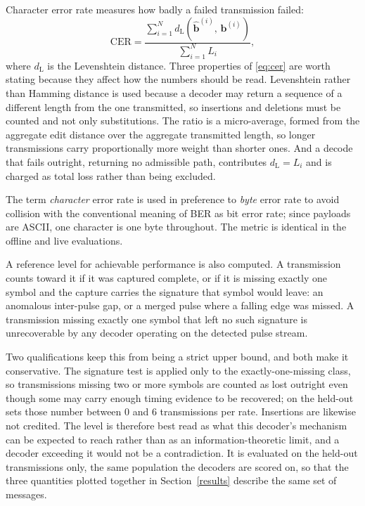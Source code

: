 Character error rate measures how badly a failed transmission failed:
\begin{equation}
\mathrm{CER} = \frac{\sum_{i=1}^{N}
  d_{\mathrm{L}}\!\left(\hat{\mathbf{b}}^{(i)},\,\mathbf{b}^{(i)}\right)}
  {\sum_{i=1}^{N} L_i},
\label{eq:cer}
\end{equation}
where $d_{\mathrm{L}}$ is the Levenshtein distance. Three properties of
\eqref{eq:cer} are worth stating because they affect how the numbers should be
read. Levenshtein rather than Hamming distance is used because a decoder may
return a sequence of a different length from the one transmitted, so insertions
and deletions must be counted and not only substitutions. The ratio is a
micro-average, formed from the aggregate edit distance over the aggregate
transmitted length, so longer transmissions carry proportionally more weight
than shorter ones. And a decode that fails outright, returning no admissible
path, contributes $d_{\mathrm{L}} = L_i$ and is charged as total loss rather
than being excluded.

The term \emph{character} error rate is used in preference to \emph{byte} error
rate to avoid collision with the conventional meaning of BER as bit error rate;
since payloads are ASCII, one character is one byte throughout. The metric is
identical in the offline and live evaluations.

A reference level for achievable performance is also computed. A transmission
counts toward it if it was captured complete, or if it is missing exactly one
symbol and the capture carries the signature that symbol would leave: an
anomalous inter-pulse gap, or a merged pulse where a falling edge was missed. A
transmission missing exactly one symbol that left no such signature is
unrecoverable by any decoder operating on the detected pulse stream.

Two qualifications keep this from being a strict upper bound, and both make it
conservative. The signature test is applied only to the exactly-one-missing
class, so transmissions missing two or more symbols are counted as lost
outright even though some may carry enough timing evidence to be recovered;
on the held-out sets those number between 0 and 6 transmissions per rate.
Insertions are likewise not credited. The level is therefore best read as what
this decoder's mechanism can be expected to reach rather than as an
information-theoretic limit, and a decoder exceeding it would not be a
contradiction. It
is evaluated on the held-out transmissions only, the same population the
decoders are scored on, so that the three quantities plotted together in
Section~\ref{results} describe the same set of messages.

